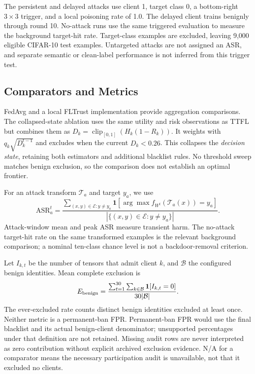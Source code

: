 \documentclass[conference,compsoc]{IEEEtran}
\newcommand{\clip}{\operatorname{clip}_{[0,1]}}
\newcommand{\ind}{\mathbf{1}}
\begin{document}
The persistent and delayed attacks use client 1, target class 0, a bottom-right $3\times3$ trigger, and a local poisoning rate of 1.0. The delayed client trains benignly through round 10. No-attack runs use the same triggered evaluation to measure the background target-hit rate. Target-class examples are excluded, leaving 9,000 eligible CIFAR-10 test examples. Untargeted attacks are not assigned an ASR, and separate semantic or clean-label performance is not inferred from this trigger test.

\subsection{Comparators and Metrics}
FedAvg and a local FLTrust implementation provide aggregation comparisons. The collapsed-state ablation uses the same utility and risk observations as TTFL but combines them as $D_k=\clip(H_k(1-R_k))$. It weights with $q_k\sqrt{D_k^{t-1}}$ and excludes when the current $D_k<0.26$. This collapses the \emph{decision state}, retaining both estimators and additional blacklist rules. No threshold sweep matches benign exclusion, so the comparison does not establish an optimal frontier.

For an attack transform $\mathcal T_a$ and target $y_a$, we use
\begin{equation}
 \mathrm{ASR}_a^t=
 \frac{\sum_{(x,y)\in\mathcal E:y\ne y_a}
 \ind[\arg\max f_{W^t}(\mathcal T_a(x))=y_a]}
 {|\{(x,y)\in\mathcal E:y\ne y_a\}|}.
\end{equation}
Attack-window mean and peak ASR measure transient harm. The no-attack target-hit rate on the same transformed examples is the relevant background comparison; a nominal ten-class chance level is not a backdoor-removal criterion.

Let $I_{k,t}$ be the number of tensors that admit client $k$, and $\mathcal B$ the configured benign identities. Mean complete exclusion is
\begin{equation}
 E_{\rm benign}=\frac{\sum_{t=1}^{30}\sum_{k\in\mathcal B}\ind[I_{k,t}=0]}{30|\mathcal B|}.
\end{equation}
The ever-excluded rate counts distinct benign identities excluded at least once. Neither metric is a permanent-ban FPR. Permanent-ban FPR would use the final blacklist and its actual benign-client denominator; unsupported percentages under that definition are not retained. Missing audit rows are never interpreted as zero contribution without explicit archived exclusion evidence. N/A for a comparator means the necessary participation audit is unavailable, not that it excluded no clients.
\end{document}
